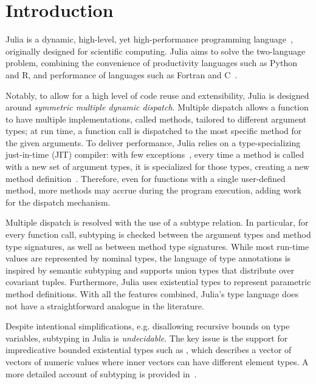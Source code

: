 \chapter{Introduction}

Julia is a dynamic, high-level, yet high-performance programming
language~\cite{TODO},
originally designed for scientific computing.
Julia aims to solve the two-language problem, combining the convenience of
productivity languages such as Python and R, and performance of languages such
as Fortran and C~\cite{TODO}.

Notably, to allow for a high level of code reuse and extensibility,
Julia is designed around \emph{symmetric multiple dynamic dispatch}.
Multiple dispatch allows a function to have multiple implementations, called
methods, tailored to different argument types; at run time, a function
call is dispatched to the most specific method for the given arguments.
To deliver performance, Julia relies on a type-specializing just-in-time (JIT)
compiler: with few exceptions~\cite{TODO},
every time a method is called with a new set of argument types,
it is specialized for those types, creating a new method definition~\cite{TODO}.
Therefore, even for functions with a single user-defined method,
more methods may accrue during the program execution,
adding work for the dispatch mechanism.


Multiple dispatch is resolved with the use of a subtype relation.
In particular, for every function call, subtyping is checked between
the argument types and method type signatures,
as well as between method type signatures.
While most run-time values are represented by nominal types,
the language of type annotations is inspired by semantic subtyping
and supports union types that distribute over covariant tuples.
Furthermore, Julia uses existential types to represent
parametric method definitions.
With all the features combined, Julia's type language
does not have a straightforward analogue in the literature.


Despite intentional simplifications, e.g. disallowing recursive bounds on type
variables, subtyping in Julia is \emph{undecidable}.
The key issue is the support for impredicative bounded existential types
such as , which
describes a vector of vectors of numeric values where inner vectors
can have different element types.
A more detailed account of subtyping is provided in~.

